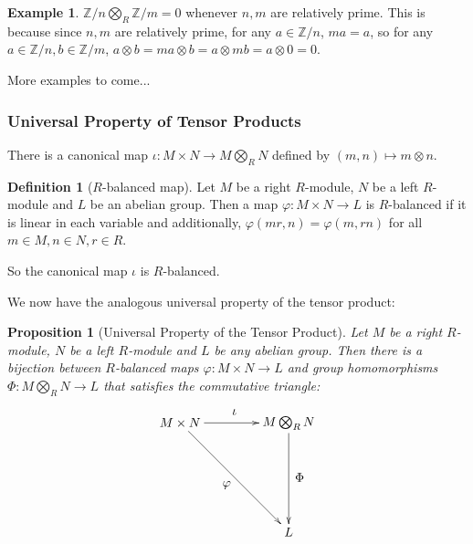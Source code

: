 \documentclass[11pt]{article}
\theoremstyle{definition}
\newtheorem*{defn}{Definition}
\theoremstyle{plain}
\theoremstyle{plain}
\newtheorem{prop}{Proposition}
\theoremstyle{plain}
\theoremstyle{definition}
\newtheorem{ex}{Example}
\begin{document}
\begin{ex}
$\mathbb{Z}/n \bigotimes_R \mathbb{Z}/m = 0$ whenever $n,m$ are relatively prime. This is because since $n,m$ are relatively prime, for any $a \in \mathbb{Z}/n$, $ma = a$, so for any $a \in \mathbb{Z}/n, b \in \mathbb{Z}/m$, $a \otimes b = ma \otimes b = a \otimes mb = a \otimes 0 = 0$.
\end{ex}

More examples to come...

\subsubsection*{Universal Property of Tensor Products}

There is a canonical map $\iota: M \times N \to M \bigotimes_R N$ defined by $(m,n) \mapsto m \otimes n$.

\begin{defn}[$R$-balanced map]
Let $M$ be a right $R$-module, $N$ be a left $R$-module and $L$ be an abelian group. Then a map $\varphi: M \times N \to L$ is $R$-balanced if it is linear in each variable and additionally, $\varphi(mr, n) = \varphi(m, rn)$ for all $m \in M, n \in N, r \in R$.
\end{defn}

So the canonical map $\iota$ is $R$-balanced.

We now have the analogous universal property of the tensor product:

\begin{prop}[Universal Property of the Tensor Product]
Let $M$ be a right $R$-module, $N$ be a left $R$-module and $L$ be any abelian group. Then there is a bijection between $R$-balanced maps $\varphi: M \times N \to L$ and group homomorphisms $\Phi: M \bigotimes_R N \to L$ that satisfies the commutative triangle:

\begin{equation*}
\begin{xy}
(0,0)*+{M \times N}="v1"; (30,0)*+{M \bigotimes_R N}="v2"; (30, -30)*+{L}="v3";
{\ar "v1";"v2"}?*!/_3mm/{\iota};
{\ar "v1";"v3"}?*!/^3mm/{\varphi};
{\ar "v2";"v3"}?*!/_3mm/{\Phi};
\end{xy}
\end{equation*}
\end{prop}
\end{document}
